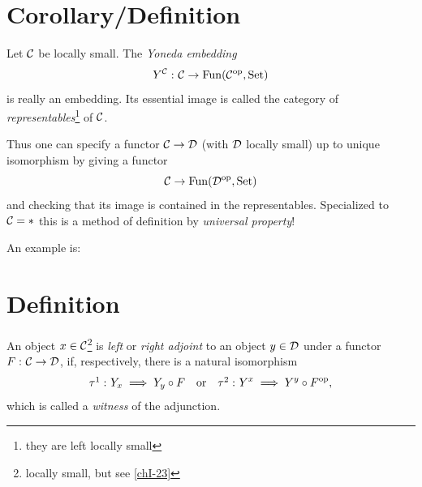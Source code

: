     \section{Corollary/Definition}
        Let $\mathcal{C}$ be locally small. The \emph{Yoneda embedding}
        \begin{equation*}
            Y^{\mathcal{C}} \,\colon \mathcal{C} \to \operatorname{Fun}(\mathcal{C}^{\operatorname{op}}, \operatorname{Set})
        \end{equation*}
        is really an embedding. Its essential image is called the category of \emph{representables}\footnote{they are left locally small} of $\mathcal{C}$.

        Thus one can specify a functor $\mathcal{C} \to \mathcal{D}$ (with $\mathcal{D}$ locally small) up to unique isomorphism by giving a functor
        \begin{equation*}
            \mathcal{C} \to \operatorname{Fun}(\mathcal{D}^{\operatorname{op}}, \operatorname{Set})
        \end{equation*}
        and checking that its image is contained in the representables. Specialized to $\mathcal{C} = *$ this is a method of definition by \emph{universal property}!
        \medskip
        
        An example is:
    \section{Definition}
        An object $x \in \mathcal{C}$\footnote{locally small, but see \ref{chI-23}\label{locsm}} is \emph{left} or \emph{right adjoint} to an object $y \in \mathcal{D}$ under a functor $F \,\colon \mathcal{C} \to \mathcal{D}$, if, respectively, there is a natural isomorphism
        \begin{equation*}
            \tau\footnotemark \,\colon Y_x \implies Y_y \circ F \quad \text{or} \quad \tau\footnotemark \,\colon Y^x \implies Y^y \circ F^{\op},
        \end{equation*}
        which is called a \emph{witness} of the adjunction.
        \addtocounter{footnote}{-2}
